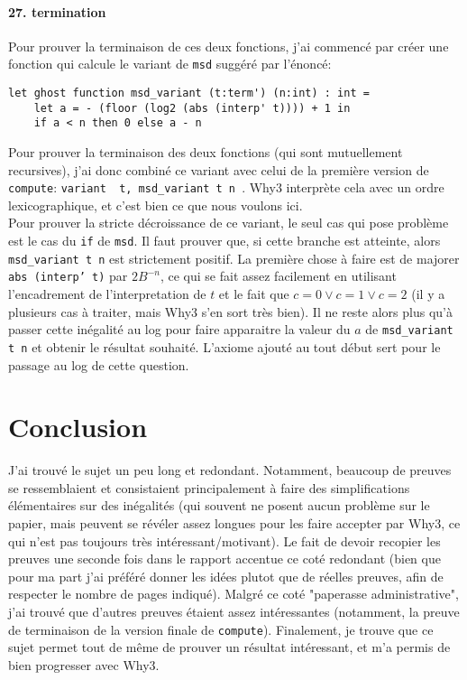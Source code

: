 \documentclass[a4paper]{article}%
\begin{document}
	\paragraph{27. termination} Pour prouver la terminaison de ces deux fonctions, j'ai commencé par créer une fonction qui calcule
	le variant de \texttt{msd} suggéré par l'énoncé:
	\begin{verbatim}
let ghost function msd_variant (t:term') (n:int) : int =
	let a = - (floor (log2 (abs (interp' t)))) + 1 in
	if a < n then 0 else a - n
	\end{verbatim}
	Pour prouver la terminaison des deux fonctions (qui sont mutuellement recursives),
	j'ai donc combiné ce variant avec celui de la première version de \texttt{compute}:
	\texttt{variant { t, msd_variant t n }}.
	Why3 interprète cela avec un ordre lexicographique, et c'est bien ce que nous voulons ici.\\

	Pour prouver la stricte décroissance de ce variant, le seul cas qui pose problème est le cas du \texttt{if}
	de \texttt{msd}. Il faut prouver que, si cette branche est atteinte, alors \texttt{msd_variant t n}
	est strictement positif. La première chose à faire est de majorer \texttt{abs (interp' t)} par $2B^{-n}$,
	ce qui se fait assez facilement en utilisant l'encadrement de l'interpretation de $t$ et le fait que $c=0 \vee c=1 \vee c=2$
	(il y a plusieurs cas à traiter, mais Why3 s'en sort très bien). Il ne reste alors plus qu'à passer cette inégalité au log
	pour faire apparaitre la valeur du $a$ de \texttt{msd_variant t n} et obtenir le résultat souhaité.
	L'axiome ajouté au tout début sert pour le passage au log de cette question.

	\section{Conclusion}

	J'ai trouvé le sujet un peu long et redondant. Notamment, beaucoup de preuves se ressemblaient et consistaient principalement
	à faire des simplifications élémentaires sur des inégalités (qui souvent ne posent aucun problème sur le papier,
	mais peuvent se révéler assez longues pour les faire accepter par Why3, ce qui n'est pas toujours très intéressant/motivant).
	Le fait de devoir recopier les preuves une seconde fois dans le rapport accentue ce coté redondant (bien que pour ma part
	j'ai préféré donner les idées plutot que de réelles preuves, afin de respecter le nombre de pages indiqué).
	Malgré ce coté "paperasse administrative", j'ai trouvé que d'autres preuves étaient assez intéressantes
	(notamment, la preuve de terminaison de la version finale de \texttt{compute}).
	Finalement, je trouve que ce sujet permet tout de même de prouver un résultat intéressant,
	et m'a permis de bien progresser avec Why3.\\
	
\end{document}
